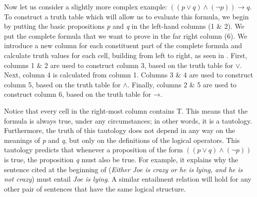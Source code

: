 Now let us consider a slightly more complex example: $((p\vee q) \wedge (\neg p)) \rightarrow q$. To construct a truth table which will allow us to evaluate this formula, we begin by putting the basic propositions \textit{p} and \textit{q} in the left-hand columns (1 \& 2). We put the complete formula that we want to prove in the far right column (6). We introduce a new column for each constituent part of the complete formula and calculate truth values for each cell, building from left to right, as seen in . First, columns 1 \& 2 are used to construct column 3, based on the truth table for {$\vee$}. Next, column 4 is calculated from column 1. Columns 3 \& 4 are used to construct column 5, based on the truth table for {$\wedge$}. Finally, columns 2 \& 5 are used to construct column 6, based on the truth table for →.



Notice that every cell in the right-most column contains T. This means that the formula is always true, under any circumstances; in other words, it is a tautology. Furthermore, the truth of this tautology does not depend in any way on the meanings of \textit{p} and \textit{q}, but only on the definitions of the logical operators. This tautology predicts that whenever a proposition of the form $((p\vee q) \wedge (\neg p))$ is true, the proposition \textit{q} must also be true. For example, it explains why the sentence cited at the beginning of  (\textit{Either Joe is crazy or he is lying, and he is not crazy}) must entail \textit{Joe is lying}. A similar entailment relation will hold for any other pair of sentences that have the same logical structure.

